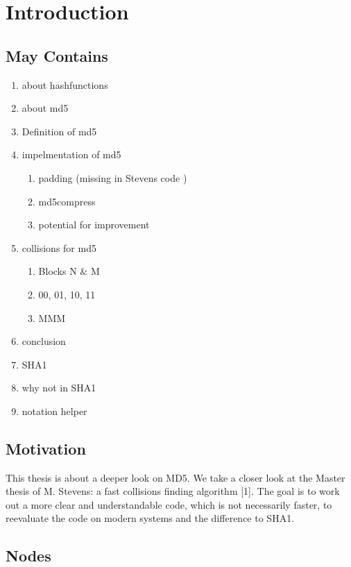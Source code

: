 \chapter{Introduction}
\section{May Contains}
\begin{enumerate}

    \item about hashfunctions
    \item about md5
    \item Definition of md5
    \item impelmentation of md5
        \begin{enumerate}
            \item padding (missing in Stevens code )
            \item md5compress
            \item potential for improvement 
        \end{enumerate}
    \item collisions for md5
        \begin{enumerate}
            \item Blocks N $\&$ M
            \item 00, 01, 10, 11
            \item MMM
        \end{enumerate}
    \item conclusion
    \item SHA1
    \item why not in SHA1
    \item notation helper

\end{enumerate}
\section*{Motivation}
This thesis is about a deeper look on MD5.
We take a closer look at the Master thesis of M. Stevens: a fast collisions finding algorithm [1].
The goal is to work out a more clear and understandable code, which is not necessarily faster, to reevaluate the code on modern systems and the difference to SHA1. 


\section*{Nodes}
 
